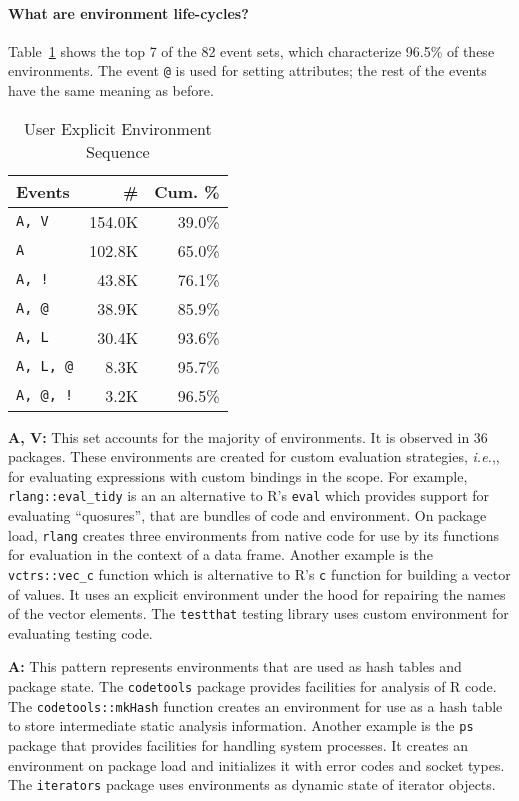 \documentclass[10pt,review,sigplan,anonymous=true,authorversion=true,nonacm=true]{acmart}
\newcommand{\code}[1]{\lstinline |#1|\xspace}
\newcommand{\ie}{\emph{i.e.},\xspace}
\begin{document}
\paragraph{What are environment life-cycles?}
Table~\ref{table:user_explicit_env_seq} shows the top 7 of the 82 event sets, which
characterize 96.5\% of these environments. The event \texttt{@} is
used for setting attributes; the rest of the events have the same meaning as
before.

\begin{table}[!h]
  \small
  \caption{User Explicit Environment Sequence} \label{table:user_explicit_env_seq}
  \centering
  \begin{tabular}{lrr}
    \toprule
    \textbf{Events}&\textbf{\#}&\textbf{Cum. \%}\\
    \midrule
    \texttt{A, V}&154.0K&39.0\%\\
    \texttt{A}&102.8K&65.0\%\\
    \texttt{A, !}&43.8K&76.1\%\\
    \texttt{A, @}&38.9K&85.9\%\\
    \texttt{A, L}&30.4K&93.6\%\\
    \texttt{A, L, @}&8.3K&95.7\%\\
    \texttt{A, @, !}&3.2K&96.5\%\\
    \bottomrule
  \end{tabular}
\end{table}

\noindent
\textbf{A, V:} This set accounts for the majority of environments. It is
observed in 36 packages. These environments are created for custom evaluation
strategies, \ie, for evaluating expressions with custom bindings in the scope.
For example, \code{rlang::eval_tidy} is an an alternative to R's \code{eval}
which provides support for evaluating ``quosures'', that are bundles of code
and environment. On package load, \code{rlang} creates three environments from
native code for use by its functions for evaluation in the context of a data
frame. Another example is the \code{vctrs::vec_c} function which is
alternative to R's \code{c} function for building a vector of values. It uses
an explicit environment under the hood for repairing the names of the vector
elements. The \code{testthat} testing library uses custom environment for
evaluating testing code.

\noindent
\textbf{A:} This pattern represents environments that are used as hash
tables and package state. The \code{codetools} package provides facilities for
analysis of R code. The \code{codetools::mkHash} function creates an
environment for use as a hash table to store intermediate static analysis
information. Another example is the \code{ps} package that provides facilities
for handling system processes. It creates an environment on package load and
initializes it with error codes and socket types. The \code{iterators} package
uses environments as dynamic state of iterator objects.
\end{document}
